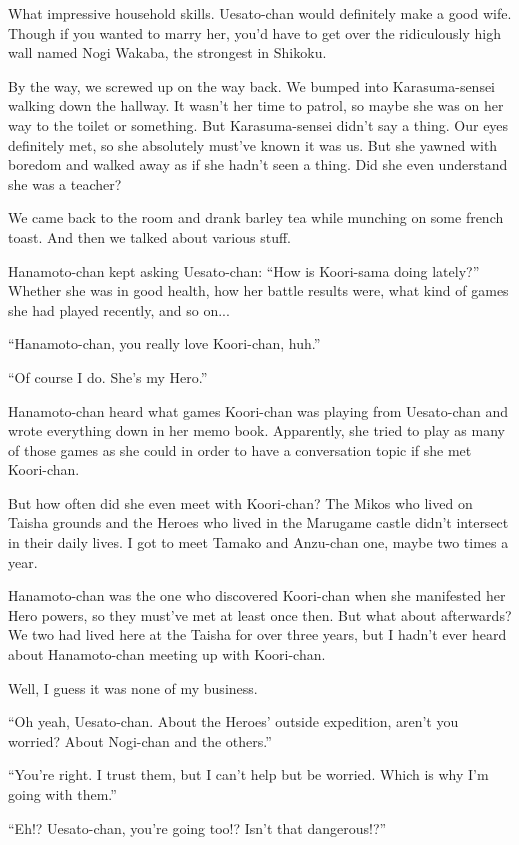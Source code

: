 What impressive household skills. Uesato-chan would definitely make a good wife. Though if you wanted to marry her, you'd have to get over the ridiculously high wall named Nogi Wakaba, the strongest in Shikoku.

By the way, we screwed up on the way back. We bumped into Karasuma-sensei walking down the hallway. It wasn't her time to patrol, so maybe she was on her way to the toilet or something. But Karasuma-sensei didn't say a thing. Our eyes definitely met, so she absolutely must've known it was us. But she yawned with boredom and walked away as if she hadn't seen a thing. Did she even understand she was a teacher?

We came back to the room and drank barley tea while munching on some french toast. And then we talked about various stuff.

Hanamoto-chan kept asking Uesato-chan: ``How is Koori-sama doing lately?'' Whether she was in good health, how her battle results were, what kind of games she had played recently, and so on...

``Hanamoto-chan, you really love Koori-chan, huh.''

``Of course I do. She's my Hero.''

Hanamoto-chan heard what games Koori-chan was playing from Uesato-chan and wrote everything down in her memo book. Apparently, she tried to play as many of those games as she could in order to have a conversation topic if she met Koori-chan.

But how often did she even meet with Koori-chan? The Mikos who lived on Taisha grounds and the Heroes who lived in the Marugame castle didn't intersect in their daily lives. I got to meet Tamako and Anzu-chan one, maybe two times a year.

Hanamoto-chan was the one who discovered Koori-chan when she manifested her Hero powers, so they must've met at least once then. But what about afterwards? We two had lived here at the Taisha for over three years, but I hadn't ever heard about Hanamoto-chan meeting up with Koori-chan.

Well, I guess it was none of my business.

``Oh yeah, Uesato-chan. About the Heroes' outside expedition, aren't you worried? About Nogi-chan and the others.''

``You're right. I trust them, but I can't help but be worried. Which is why I'm going with them.''

``Eh!? Uesato-chan, you're going too!? Isn't that dangerous!?''

